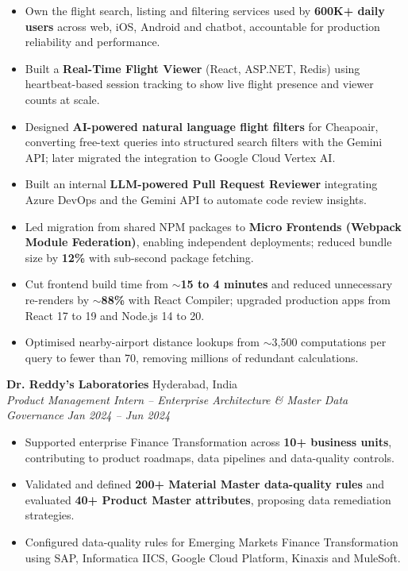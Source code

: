 \documentclass[a4paper,10pt]{extarticle}
\newcommand{\resumeSubheading}[4]{%
    \textbf{#1} \hfill #2\\
    \textit{#3} \hfill \textit{#4}}
\begin{document}
\begin{itemize}
    \item Own the flight search, listing and filtering services used by \textbf{600K+ daily users}
    across web, iOS, Android and chatbot, accountable for production reliability and performance.

    \item Built a \textbf{Real-Time Flight Viewer} (React, ASP.NET, Redis) using heartbeat-based
    session tracking to show live flight presence and viewer counts at scale.

    \item Designed \textbf{AI-powered natural language flight filters} for Cheapoair, converting
    free-text queries into structured search filters with the Gemini API; later migrated the
    integration to Google Cloud Vertex AI.

    \item Built an internal \textbf{LLM-powered Pull Request Reviewer} integrating Azure DevOps and
    the Gemini API to automate code review insights.

    \item Led migration from shared NPM packages to \textbf{Micro Frontends (Webpack Module
    Federation)}, enabling independent deployments; reduced bundle size by \textbf{12\%} with
    sub-second package fetching.

    \item Cut frontend build time from \textbf{${\sim}$15 to 4 minutes} and reduced unnecessary
    re-renders by ${\sim}$\textbf{88\%} with React Compiler; upgraded production apps from React 17
    to 19 and Node.js 14 to 20.

    \item Optimised nearby-airport distance lookups from ${\sim}$3,500 computations per query to
    fewer than 70, removing millions of redundant calculations.
\end{itemize}

\vspace{3pt}
\resumeSubheading
{Dr. Reddy's Laboratories}
{Hyderabad, India}
{Product Management Intern -- Enterprise Architecture \& Master Data Governance}
{Jan 2024 -- Jun 2024}

\begin{itemize}
    \item Supported enterprise Finance Transformation across \textbf{10+ business units},
    contributing to product roadmaps, data pipelines and data-quality controls.

    \item Validated and defined \textbf{200+ Material Master data-quality rules} and evaluated
    \textbf{40+ Product Master attributes}, proposing data remediation strategies.

    \item Configured data-quality rules for Emerging Markets Finance Transformation using SAP,
    Informatica IICS, Google Cloud Platform, Kinaxis and MuleSoft.
\end{itemize}
\end{document}
